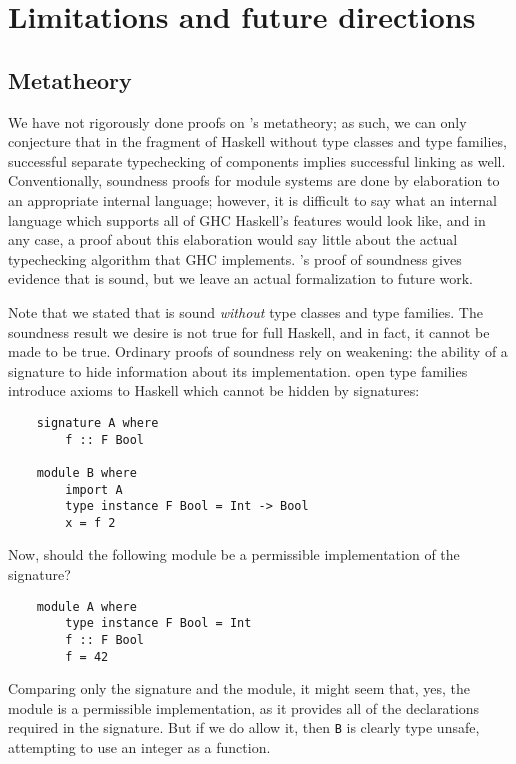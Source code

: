 \chapter{Limitations and future directions}
\label{sec:limitations}

\section{Metatheory}
\label{sec:metatheory}

We have not rigorously done proofs on \Backpack{}'s metatheory; as such,
we can only conjecture that in the fragment of Haskell without type
classes and type families, successful separate typechecking of
components implies successful linking as well.  Conventionally,
soundness proofs for module systems are done by elaboration to an
appropriate internal language; however, it is difficult to say what an
internal language which supports all of GHC Haskell's features would
look like, and in any case, a proof about this elaboration would say
little about the actual typechecking algorithm that GHC
implements.  \OldBackpack{}'s proof
of soundness gives evidence that \Backpack{} is sound, but we leave
an actual formalization to future work.

Note that we stated that \Backpack{} is sound \emph{without} type classes
and type families.  The soundness result we desire is not true for full
Haskell, and in fact, it cannot be made to be true.
Ordinary proofs of soundness rely on weakening: the ability of a signature
to hide information about its implementation.
open type families~\cite{schrijvers+:typefamilies}
introduce axioms to Haskell which cannot be hidden by signatures:

\begin{lstlisting}
    signature A where
        f :: F Bool

    module B where
        import A
        type instance F Bool = Int -> Bool
        x = f 2
\end{lstlisting}
%
Now, should the following module be a permissible implementation of the
signature?

\begin{lstlisting}
    module A where
        type instance F Bool = Int
        f :: F Bool
        f = 42
\end{lstlisting}
%
Comparing only the signature and the module, it might seem that, yes,
the module is a permissible implementation, as it provides all of the
declarations required in the signature.  But if we do allow it,
then \verb|B| is clearly type unsafe, attempting to use an integer
as a function.


